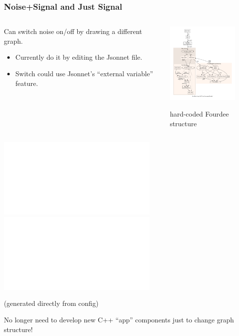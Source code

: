 \documentclass[xcolor=dvipsnames]{beamer}
\begin{document}
\begin{frame}
  \frametitle{Noise+Signal and Just Signal}

  \vspace{-10mm}

  \begin{columns}
    \begin{column}{0.7\textwidth}
      \footnotesize
      Can switch noise on/off by drawing a different graph.
      \begin{itemize}\scriptsize
      \item Currently do it by editing the Jsonnet file.
      \item Switch could use Jsonnet's ``external variable'' feature.
      \end{itemize}
    \end{column}

    \begin{column}{0.3\textwidth}
      \begin{center}
        \includegraphics[height=4cm]{fourdee.pdf}

        \tiny hard-coded Fourdee structure
      \end{center}
    \end{column}
  \end{columns}

  \vspace{-10mm}

  
  \begin{center}

    \includegraphics<1>[width=\textwidth]{test_simgraph_noise.pdf}
    \includegraphics<2>[width=\textwidth]{test_simgraph_signal.pdf}

    {\scriptsize (generated directly from config)}
  \end{center}


  No longer need to develop new C++ ``app'' components just to change
  graph structure! 
  
\end{frame}
\end{document}
